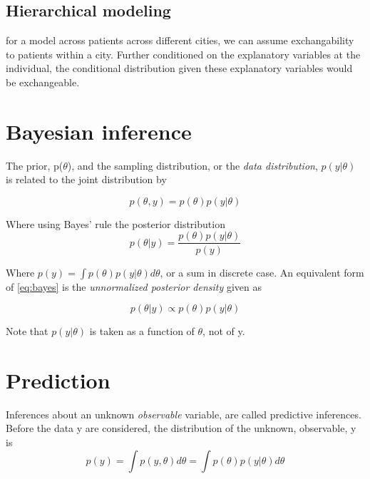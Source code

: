 \documentclass[
]{book}
\theoremstyle{definition}
\theoremstyle{definition}
\theoremstyle{definition}
\theoremstyle{definition}
\theoremstyle{remark}
\begin{document}
\hypertarget{hierarchical-modeling}{%
\subsection*{Hierarchical modeling}\label{hierarchical-modeling}}

for a model across patients across different cities, we can assume exchangability to patients within a city. Further conditioned on the explanatory variables at the individual, the conditional distribution given these explanatory variables would be exchangeable.

\hypertarget{bayesian-inference}{%
\section{Bayesian inference}\label{bayesian-inference}}

The prior, p(\(\theta\)), and the sampling distribution, or the \emph{data distribution}, \(p(y|\theta)\) is related to the joint distribution by

\[ p(\theta,y) = p(\theta)p(y | \theta)\]

Where using Bayes' rule the posterior distribution
\begin{equation}
p(\theta | y ) = \frac{p(\theta)p(y| \theta)}{p(y)}
\label{eq:bayes}
\end{equation}

Where \(p(y) = \int p(\theta)p(y | \theta)d\theta\), or a sum in discrete case. An equivalent form of \eqref{eq:bayes} is the \emph{unnormalized posterior density} given as

\begin{equation}
p(\theta | y ) \propto p(\theta)p(y | \theta)
\label{eq:unnorm}
\end{equation}

Note that \(p(y | \theta)\) is taken as a function of \(\theta\), not of y.

\hypertarget{prediction}{%
\section*{Prediction}\label{prediction}}

Inferences about an unknown \emph{observable} variable, are called predictive inferences. Before the data y are considered, the distribution of the unknown, observable, y is \[ p(y) = \int p(y,\theta)d\theta = \int p(\theta)p(y | \theta)d\theta\]
\end{document}
